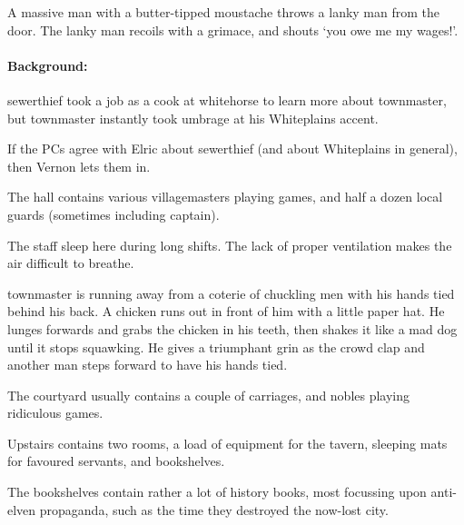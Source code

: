 \begin{multicols}{2}
\begin{boxtext}

  A massive man with a butter-tipped moustache throws a lanky man from the door.
  The lanky man recoils with a grimace, and shouts `you owe me my wages!'.

\end{boxtext}

\paragraph{Background:}
\Gls{sewerthief} took a job as a cook at \gls{whitehorse} to learn more about \gls{townmaster}, but \gls{townmaster} instantly took umbrage at his Whiteplains accent.

If the PCs agree with Elric about \gls{sewerthief} (and about Whiteplains in general), then Vernon lets them in.


The hall contains various villagemasters playing games, and half a dozen local guards (sometimes including \gls{captain}).



The staff sleep here during long shifts.  The lack of proper ventilation makes the air difficult to breathe.


\begin{boxtext}

  \Gls{townmaster} is running away from a coterie of chuckling men with his hands tied behind his back.
   A chicken runs out in front of him with a little paper hat.
   He lunges forwards and grabs the chicken in his teeth, then shakes it like a mad dog until it stops squawking.
   He gives a triumphant grin as the crowd clap and another man steps forward to have his hands tied.

\end{boxtext}

The courtyard usually contains a couple of carriages, and nobles playing ridiculous games.


Upstairs contains two rooms, a load of equipment for the tavern, sleeping mats for favoured servants, and bookshelves.

The bookshelves contain rather a lot of history books, most focussing upon anti-elven propaganda, such as the time they destroyed the now-lost city.


\end{multicols}

